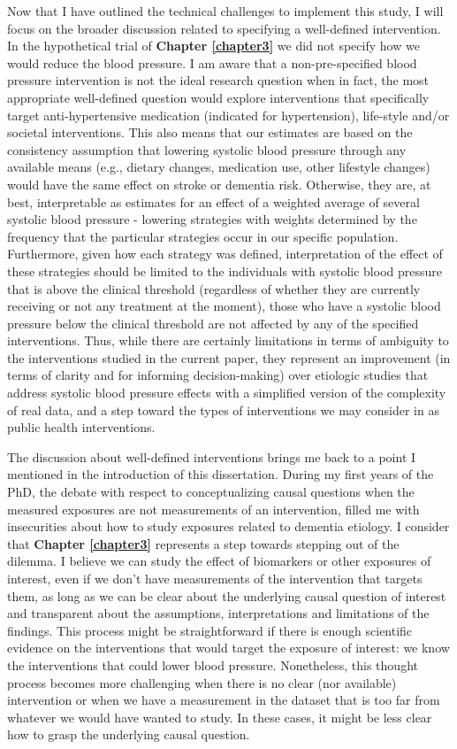 \documentclass[
]{book}
\begin{document}
Now that I have outlined the technical challenges to implement this study, I will focus on the broader discussion related to specifying a well-defined intervention. In the hypothetical trial of \textbf{Chapter \ref{chapter3}} we did not specify how we would reduce the blood pressure. I am aware that a non-pre-specified blood pressure intervention is not the ideal research question when in fact, the most appropriate well-defined question would explore interventions that specifically target anti-hypertensive medication (indicated for hypertension), life-style and/or societal interventions. This also means that our estimates are based on the consistency assumption that lowering systolic blood pressure through any available means (e.g., dietary changes, medication use, other lifestyle changes) would have the same effect on stroke or dementia risk. Otherwise, they are, at best, interpretable as estimates for an effect of a weighted average of several systolic blood pressure - lowering strategies with weights determined by the frequency that the particular strategies occur in our specific population\autocite{waterkills,hernan2011}. Furthermore, given how each strategy was defined, interpretation of the effect of these strategies should be limited to the individuals with systolic blood pressure that is above the clinical threshold (regardless of whether they are currently receiving or not any treatment at the moment), those who have a systolic blood pressure below the clinical threshold are not affected by any of the specified interventions. Thus, while there are certainly limitations in terms of ambiguity to the interventions studied in the current paper, they represent an improvement (in terms of clarity and for informing decision-making) over etiologic studies that address systolic blood pressure effects with a simplified version of the complexity of real data, and a step toward the types of interventions we may consider in as public health interventions.

The discussion about well-defined interventions brings me back to a point I mentioned in the introduction of this dissertation. During my first years of the PhD, the debate with respect to conceptualizing causal questions when the measured exposures are not measurements of an intervention, filled me with insecurities about how to study exposures related to dementia etiology. I consider that \textbf{Chapter \ref{chapter3}} represents a step towards stepping out of the dilemma. I believe we can study the effect of biomarkers or other exposures of interest, even if we don't have measurements of the intervention that targets them, as long as we can be clear about the underlying causal question of interest and transparent about the assumptions, interpretations and limitations of the findings. This process might be straightforward if there is enough scientific evidence on the interventions that would target the exposure of interest: we know the interventions that could lower blood pressure. Nonetheless, this thought process becomes more challenging when there is no clear (nor available) intervention or when we have a measurement in the dataset that is too far from whatever we would have wanted to study. In these cases, it might be less clear how to grasp the underlying causal question.
\end{document}

